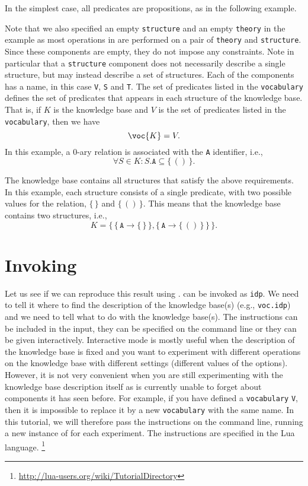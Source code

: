 \documentclass{article}
\begin{document}
In the simplest case, all predicates are propositions, as in the following
example.

Note that we also specified an empty \texttt{structure} and
an empty \texttt{theory}
in the example as most operations in \idp are performed on a pair
of \texttt{theory} and \texttt{structure}.
Since these components are empty, they do not impose any constraints.
Note in particular that a \texttt{structure} component does not
necessarily describe a single structure, but may instead describe
a set of structures.
Each of the components has a name, in this case
\texttt{V}, \texttt{S} and \texttt{T}.
The set of predicates listed in the \texttt{vocabulary} defines
the set of predicates that appears in each structure of the knowledge base.
That is, if $K$ is the knowledge base and $V$ is the set of predicates
listed in the \texttt{vocabulary}, then we have
$$
\voc{K} = V
.
$$
In this example, a $0$-ary relation is
associated with the \texttt{A} identifier, i.e.,
$$
\forall S \in K : S.\mathtt{A} \subseteq \{\, () \,\}
.
$$

The knowledge base contains all structures that satisfy
the above requirements.  In this example, each structure consists
of a single predicate, with two possible values for the relation,
$\{\, \}$ and $\{\, () \,\}$.
This means that the knowledge base contains two structures, i.e.,
$$
K = \{\,
\{\, \mathtt{A} \to \{\, \} \,\},
\{\, \mathtt{A} \to \{\, () \,\} \,\}
\,\}
.
$$

\section{Invoking \idp}

Let us see if we can reproduce this result using \idp.
\idp can be invoked as \texttt{idp}.
We need to tell it where to find the description of the knowledge
base(s) (e.g., \texttt{voc.idp}) and we need to tell \idp what to do with
the knowledge base(s).  The instructions can be included in the input,
they can be specified on the command line or they can be given interactively.
Interactive mode is mostly useful when the description of the knowledge
base is fixed and you want to experiment with different operations
on the knowledge base with different settings (different values of
the options).  However, it is not very convenient when you are still
experimenting with the knowledge base description itself as
\idp is currently unable to forget about components it has seen before.
For example, if you have defined a \texttt{vocabulary} \texttt{V},
then it is impossible to replace it by a new \texttt{vocabulary} with
the same name.
In this tutorial,
we will therefore pass the instructions on the command line,
running a new instance of \idp for each experiment.
The instructions are specified in the Lua language.%
\footnote{\url{http://lua-users.org/wiki/TutorialDirectory}}
\end{document}
